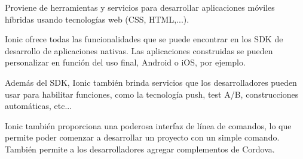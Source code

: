 Proviene de herramientas y servicios para desarrollar aplicaciones móviles híbridas usando tecnologías web (CSS, HTML,...).

Ionic ofrece todas las funcionalidades que se puede encontrar en los SDK de desarrollo de aplicaciones nativas. Las aplicaciones construidas se pueden personalizar en función del uso final, Android o iOS, por ejemplo.

Además del SDK, Ionic también brinda servicios que los desarrolladores pueden usar para habilitar funciones, como la tecnología push, test A/B, construcciones automáticas, etc...

Ionic también proporciona una poderosa interfaz de línea de comandos, lo que permite poder comenzar a desarrollar un proyecto con un simple comando. También permite a los desarrolladores agregar complementos de Cordova.


